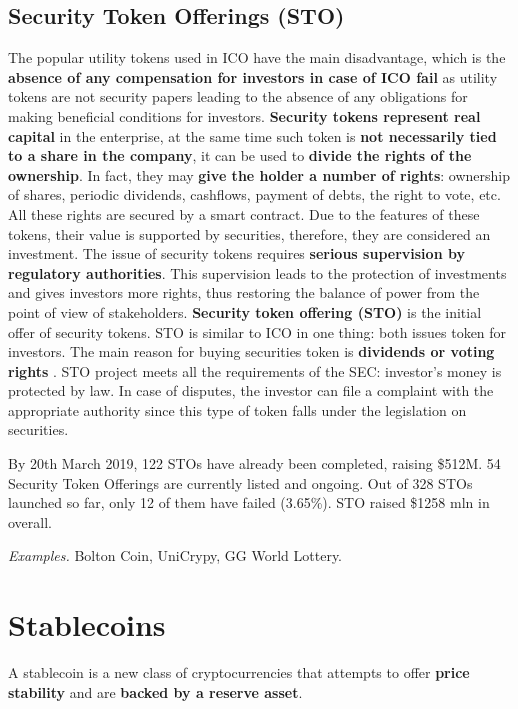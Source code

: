 \subsection{Security Token Offerings (STO)}

The popular utility tokens used in ICO have the main disadvantage, which is the \textbf{absence of any compensation for investors in case of ICO fail} as utility tokens are not security papers leading to the absence of any obligations for making beneficial conditions for investors.
\textbf{Security tokens represent real capital} in the enterprise, at the same time such token is \textbf{not necessarily tied to a share in the company}, it can be used to \textbf{divide the rights of the ownership}. In fact, they may \textbf{give the holder a number of rights}: ownership of shares, periodic dividends, cashflows, payment of debts, the right to vote, etc. All these rights are secured by a smart contract. Due to the features of these tokens, their value is supported by securities, therefore, they are considered an investment.
The issue of security tokens requires \textbf{serious supervision by regulatory authorities}. This supervision leads to the protection of investments and gives investors more rights, thus restoring the balance of power from the point of view of stakeholders.
\textbf{Security token offering (STO)} is the initial offer of security tokens. STO is similar to ICO in one thing: both issues token for investors. The main reason for buying securities token is \textbf{dividends or voting rights} .
STO project meets all the requirements of the SEC: investor's money is protected by law. In case of disputes, the investor can file a complaint with the appropriate authority since this type of token falls under the legislation on securities.

By 20th March 2019, 122 STOs have already been completed, raising \$512M.
54 Security Token Offerings are currently listed and ongoing.
Out of 328 STOs launched so far, only 12 of them have failed (3.65\%). STO raised \$1258 mln in overall.

\emph{Examples.} Bolton Coin, UniCrypy, GG World Lottery.


\section{Stablecoins}

A stablecoin is a new class of cryptocurrencies that attempts to offer \textbf{price stability} and are \textbf{backed by a reserve asset}.

